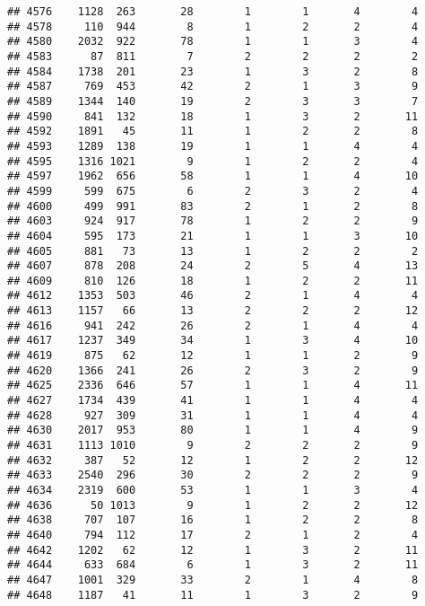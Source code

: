 \documentclass[]{article}
\begin{document}
\begin{verbatim}
## 4576    1128  263       28        1        1       4        4
## 4578     110  944        8        1        2       2        4
## 4580    2032  922       78        1        1       3        4
## 4583      87  811        7        2        2       2        2
## 4584    1738  201       23        1        3       2        8
## 4587     769  453       42        2        1       3        9
## 4589    1344  140       19        2        3       3        7
## 4590     841  132       18        1        3       2       11
## 4592    1891   45       11        1        2       2        8
## 4593    1289  138       19        1        1       4        4
## 4595    1316 1021        9        1        2       2        4
## 4597    1962  656       58        1        1       4       10
## 4599     599  675        6        2        3       2        4
## 4600     499  991       83        2        1       2        8
## 4603     924  917       78        1        2       2        9
## 4604     595  173       21        1        1       3       10
## 4605     881   73       13        1        2       2        2
## 4607     878  208       24        2        5       4       13
## 4609     810  126       18        1        2       2       11
## 4612    1353  503       46        2        1       4        4
## 4613    1157   66       13        2        2       2       12
## 4616     941  242       26        2        1       4        4
## 4617    1237  349       34        1        3       4       10
## 4619     875   62       12        1        1       2        9
## 4620    1366  241       26        2        3       2        9
## 4625    2336  646       57        1        1       4       11
## 4627    1734  439       41        1        1       4        4
## 4628     927  309       31        1        1       4        4
## 4630    2017  953       80        1        1       4        9
## 4631    1113 1010        9        2        2       2        9
## 4632     387   52       12        1        2       2       12
## 4633    2540  296       30        2        2       2        9
## 4634    2319  600       53        1        1       3        4
## 4636      50 1013        9        1        2       2       12
## 4638     707  107       16        1        2       2        8
## 4640     794  112       17        2        1       2        4
## 4642    1202   62       12        1        3       2       11
## 4644     633  684        6        1        3       2       11
## 4647    1001  329       33        2        1       4        8
## 4648    1187   41       11        1        3       2        9

\end{verbatim}
\end{document}
